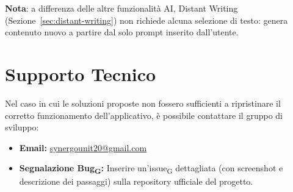 \textbf{Nota}: a differenza delle altre funzionalità AI, Distant Writing (Sezione~\ref{sec:distant-writing}) non richiede alcuna 
selezione di testo: genera contenuto nuovo a partire dal solo prompt inserito dall'utente.

\section{Supporto Tecnico}
\label{sec:supporto-tecnico}
Nel caso in cui le soluzioni proposte non fossero sufficienti a ripristinare il corretto funzionamento dell'applicativo, è possibile contattare il gruppo di sviluppo:
\begin{itemize}
    \item \textbf{Email:} \href{mailto:synergounit20@gmail.com}{synergounit20@gmail.com}
    \item \textbf{Segnalazione Bug\textsubscript{G}:} Inserire un'issue\textsubscript{G} dettagliata (con screenshot e descrizione dei passaggi) sulla repository ufficiale del progetto.
\end{itemize}